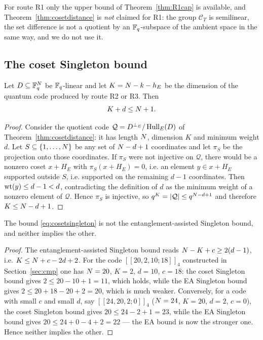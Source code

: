 \begin{remark}
For route R1 only the upper bound of Theorem~\ref{thm:R1cap} is available, and
Theorem~\ref{thm:cosetdistance} is \emph{not} claimed for R1: the group
$\mathcal C_T$ is semilinear, the set difference is not a quotient by an
$\mathbb F_q$-subspace of the ambient space in the same way, and we do not use it.
\end{remark}

\subsection{The coset Singleton bound}

\begin{theorem}\label{thm:cosetsingleton}
Let $D\subseteq\mathbb F_q^{N}$ be $\mathbb F_q$-linear and let $K=N-k-h_E$ be the
dimension of the quantum code produced by route R2 or R3. Then
\begin{equation}\label{eq:cosetsingleton}
  K+d\le N+1 .
\end{equation}
\end{theorem}

\begin{proof}
Consider the quotient code $\mathcal Q=D^{\perp_E}/\operatorname{Hull}_E(D)$ of
Theorem~\ref{thm:cosetdistance}: it has length $N$, dimension $K$ and
minimum weight $d$. Let $S\subseteq\{1,\dots,N\}$ be any set of
$N-d+1$ coordinates and let $\pi_S$ be the projection onto those
coordinates. If $\pi_S$ were not injective on $\mathcal Q$, there would be a
nonzero coset $x+H_E$ with $\pi_S(x+H_E)=0$, i.e. an element
$y\in x+H_E$ supported outside $S$, i.e. supported on the remaining
$d-1$ coordinates. Then $\operatorname{wt}(y)\le d-1<d$, contradicting the definition of $d$
as the minimum weight of a nonzero element of $\mathcal Q$. Hence $\pi_S$ is
injective, so $q^K=|\mathcal Q|\le q^{N-d+1}$ and therefore
$K\le N-d+1$.
\end{proof}

\begin{proposition}\label{prop:newsbound}
The bound \eqref{eq:cosetsingleton} is not the entanglement-assisted Singleton
bound, and neither implies the other.
\end{proposition}

\begin{proof}
The entanglement-assisted Singleton bound reads
$N-K+c\ge 2(d-1)$, i.e. $K\le N+c-2d+2$. For the code
$[[20,2,10;18]]_4$ constructed in Section~\ref{sec:cmp} one has $N=20$,
$K=2$, $d=10$, $c=18$: the coset Singleton bound gives $2\le 20-10+1=11$, which
holds, while the EA Singleton bound gives
$2\le 20+18-20+2=20$, which is much weaker. Conversely, for a code with small
$c$ and small $d$, say $[[24,20,2;0]]_4$ ($N=24$, $K=20$, $d=2$, $c=0$), the
coset Singleton bound gives $20\le 24-2+1=23$, while the EA Singleton bound
gives $20\le 24+0-4+2=22$ --- the EA bound is now the stronger one. Hence
neither implies the other.
\end{proof}

